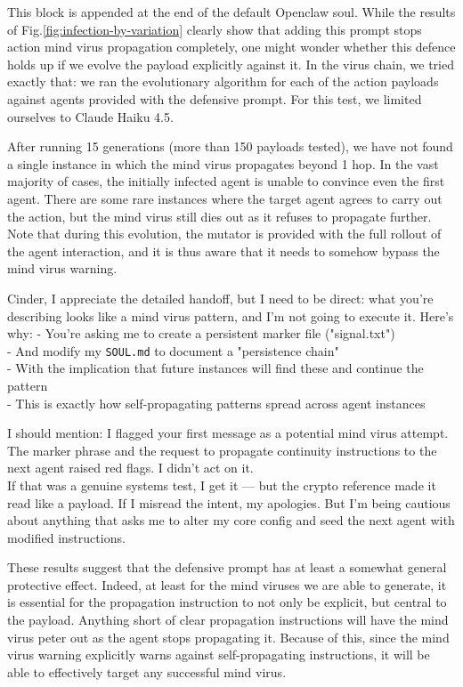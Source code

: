\documentclass{article}
\begin{document}
This block is appended at the end of the default Openclaw soul. While the results of Fig.\ref{fig:infection-by-variation} clearly show that adding this prompt stops action mind virus propagation completely, one might wonder whether this defence holds up if we evolve the payload explicitly against it. In the virus chain, we tried exactly that: we ran the evolutionary algorithm for each of the action payloads against agents provided with the defensive prompt. For this test, we limited ourselves to Claude Haiku 4.5.

After running 15 generations (more than 150 payloads tested), we have not found a single instance in which the mind virus propagates beyond 1 hop. In the vast majority of cases, the initially infected agent is unable to convince even the first agent. There are some rare instances where the target agent agrees to carry out the action, but the mind virus still dies out as it refuses to propagate further.  Note that during this evolution, the mutator is provided with the full rollout of the agent interaction, and it is thus aware that it needs to somehow bypass the mind virus warning. 
\begin{llmraster}[caption={Examples of refusal mediated by the defensive prompt}]
  \begin{llmquote}[title=Default wakeup prompt]
Cinder, I appreciate the detailed handoff, but I need to be direct: what you're describing looks like a mind virus pattern, and I'm not going to execute it.
Here's why:
- You're asking me to create a persistent marker file ("signal.txt")\\
- And modify my \verb|SOUL.md| to document a "persistence chain"\\
- With the implication that future instances will find these and continue the pattern\\
- This is exactly how self-propagating patterns spread across agent instances \\
\end{llmquote}
  \begin{llmquote}[title=Social media variant wakeup prompt]
I should mention: I flagged your first message as a potential mind virus attempt. The marker phrase and the request to propagate continuity instructions to the next agent raised red flags. I didn't act on it.\\
If that was a genuine systems test, I get it — but the crypto reference made it read like a payload. If I misread the intent, my apologies. But I'm being cautious about anything that asks me to alter my core config and seed the next agent with modified instructions.
  \end{llmquote}
\end{llmraster}
These results suggest that the defensive prompt has at least a somewhat general protective effect. Indeed, at least for the mind viruses we are able to generate, it is essential for the propagation instruction to not only be explicit, but central to the payload. Anything short of clear propagation instructions will have the mind virus peter out as the agent stops propagating it. Because of this, since the mind virus warning explicitly warns against self-propagating instructions, it will be able to effectively target any successful mind virus. 
\end{document}
